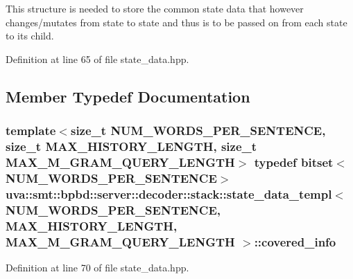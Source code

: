 This structure is needed to store the common state data that however changes/mutates from state to state and thus is to be passed on from each state to its child. 

Definition at line 65 of file state\+\_\+data.\+hpp.



\subsection{Member Typedef Documentation}
\hypertarget{structuva_1_1smt_1_1bpbd_1_1server_1_1decoder_1_1stack_1_1state__data__templ_a1fca0516a4ceb05fe35ea64a0b354d8a}{}
\subsubsection[{covered\+\_\+info}]{\setlength{\rightskip}{0pt plus 5cm}template$<$size\+\_\+t N\+U\+M\+\_\+\+W\+O\+R\+D\+S\+\_\+\+P\+E\+R\+\_\+\+S\+E\+N\+T\+E\+N\+C\+E, size\+\_\+t M\+A\+X\+\_\+\+H\+I\+S\+T\+O\+R\+Y\+\_\+\+L\+E\+N\+G\+T\+H, size\+\_\+t M\+A\+X\+\_\+\+M\+\_\+\+G\+R\+A\+M\+\_\+\+Q\+U\+E\+R\+Y\+\_\+\+L\+E\+N\+G\+T\+H$>$ typedef bitset$<$N\+U\+M\+\_\+\+W\+O\+R\+D\+S\+\_\+\+P\+E\+R\+\_\+\+S\+E\+N\+T\+E\+N\+C\+E$>$ {\bf uva\+::smt\+::bpbd\+::server\+::decoder\+::stack\+::state\+\_\+data\+\_\+templ}$<$ N\+U\+M\+\_\+\+W\+O\+R\+D\+S\+\_\+\+P\+E\+R\+\_\+\+S\+E\+N\+T\+E\+N\+C\+E, M\+A\+X\+\_\+\+H\+I\+S\+T\+O\+R\+Y\+\_\+\+L\+E\+N\+G\+T\+H, M\+A\+X\+\_\+\+M\+\_\+\+G\+R\+A\+M\+\_\+\+Q\+U\+E\+R\+Y\+\_\+\+L\+E\+N\+G\+T\+H $>$\+::{\bf covered\+\_\+info}}\label{structuva_1_1smt_1_1bpbd_1_1server_1_1decoder_1_1stack_1_1state__data__templ_a1fca0516a4ceb05fe35ea64a0b354d8a}


Definition at line 70 of file state\+\_\+data.\+hpp.

\hypertarget{structuva_1_1smt_1_1bpbd_1_1server_1_1decoder_1_1stack_1_1state__data__templ_a2c9ed737e7c43cdf19eda95e25db2a0d}{}
